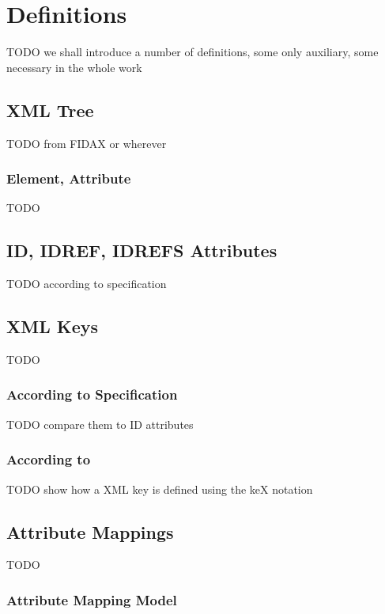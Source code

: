 \chapter{Definitions}

TODO we shall introduce a number of definitions, some only auxiliary, some necessary in the whole work

\section{XML Tree}

TODO from FIDAX or wherever

\subsection{Element, Attribute}

TODO

\section{ID, IDREF, IDREFS Attributes}

TODO according to specification

\section{XML Keys}

TODO

\subsection{According to Specification}

TODO compare them to ID attributes

\subsection{According to \cite{keX}}

TODO show how a XML key is defined using the keX notation %

\section{Attribute Mappings}

TODO 

\subsection{Attribute Mapping Model}

